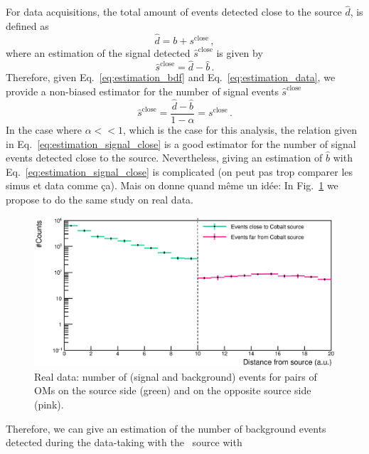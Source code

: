 For data acquisitions, the total amount of events detected close to the source $\hat{d}$, is defined as
\begin{equation}
  \hat{d} = b + s^{\text{close}}\,,
  \label{eq:estimation_data}
\end{equation}
where an estimation of the signal detected $\hat{s}^{\text{close}}$ is given by
\begin{equation}
  \hat{s}^{\text{close}} = \hat{d} - \hat{b}\,.
  \label{eq:estimation_signal_close}
\end{equation}
Therefore, given Eq.~\eqref{eq:estimation_bdf} and Eq.~\eqref{eq:estimation_data}, we provide a non-biased estimator for the number of signal events $\hat{s}^{\text{close}}$
\begin{equation}
  \hat{s}^{\text{close}} = \frac{\hat{d}-\hat{b}}{1-\alpha} = s^{\text{close}}\,.
\end{equation}
In the case where $\alpha << 1$, which is the case for this analysis, the relation given in Eq.~\eqref{eq:estimation_signal_close} is a good estimator for the number of signal events detected close to the source.
Nevertheless, giving an estimation of $\hat{b}$ with Eq.~\ref{eq:estimation_signal_close} is complicated (on peut pas trop comparer les simus et data comme ça).
Mais on donne quand même un idée:
In Fig.~\ref{fig:Co_data_bkg} we propose to do the same study on real data.
\begin{figure}[h]
  \centering
  \includegraphics[width=17cm]{commissioning/fig_commissioning/Co_data_bkg.eps}
  \caption{Real data: number of (signal and background) events for pairs of OMs on the source side (green) and on the opposite source side (pink).
    \label{fig:Co_data_bkg}}
\end{figure}

Therefore, we can give an estimation of the number of background events detected during the data-taking with the \Co\ source with

